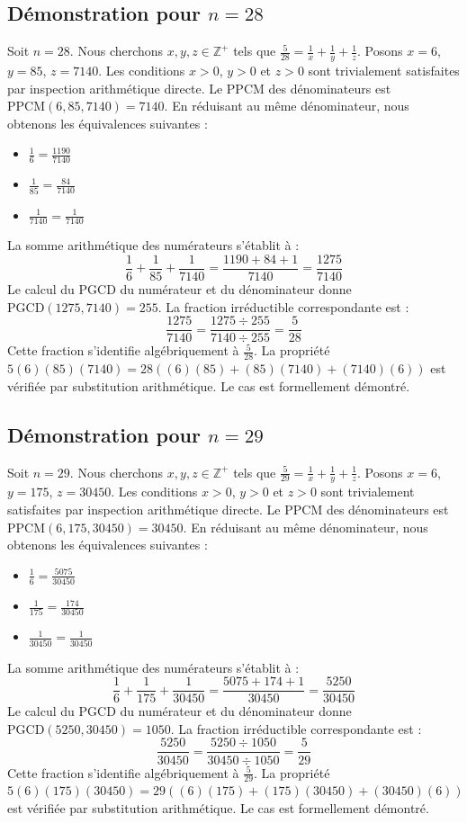 \documentclass[12pt,a4paper]{article}
\begin{document}
\subsection{Démonstration pour $n = 28$}
Soit $n = 28$. Nous cherchons $x, y, z \in \mathbb{Z}^{+}$ tels que $\frac{5}{28} = \frac{1}{x} + \frac{1}{y} + \frac{1}{z}$.
Posons $x = 6$, $y = 85$, $z = 7140$.
Les conditions $x > 0$, $y > 0$ et $z > 0$ sont trivialement satisfaites par inspection arithmétique directe.
Le PPCM des dénominateurs est $\text{PPCM}(6, 85, 7140) = 7140$.
En réduisant au même dénominateur, nous obtenons les équivalences suivantes :
\begin{itemize}
    \item $\frac{1}{6} = \frac{1190}{7140}$
    \item $\frac{1}{85} = \frac{84}{7140}$
    \item $\frac{1}{7140} = \frac{1}{7140}$
\end{itemize}
La somme arithmétique des numérateurs s'établit à :
$$ \frac{1}{6} + \frac{1}{85} + \frac{1}{7140} = \frac{1190 + 84 + 1}{7140} = \frac{1275}{7140} $$
Le calcul du PGCD du numérateur et du dénominateur donne $\text{PGCD}(1275, 7140) = 255$.
La fraction irréductible correspondante est :
$$ \frac{1275}{7140} = \frac{1275 \div 255}{7140 \div 255} = \frac{5}{28} $$
Cette fraction s'identifie algébriquement à $\frac{5}{28}$.
La propriété $5(6)(85)(7140) = 28((6)(85) + (85)(7140) + (7140)(6))$ est vérifiée par substitution arithmétique.
Le cas est formellement démontré.

\subsection{Démonstration pour $n = 29$}
Soit $n = 29$. Nous cherchons $x, y, z \in \mathbb{Z}^{+}$ tels que $\frac{5}{29} = \frac{1}{x} + \frac{1}{y} + \frac{1}{z}$.
Posons $x = 6$, $y = 175$, $z = 30450$.
Les conditions $x > 0$, $y > 0$ et $z > 0$ sont trivialement satisfaites par inspection arithmétique directe.
Le PPCM des dénominateurs est $\text{PPCM}(6, 175, 30450) = 30450$.
En réduisant au même dénominateur, nous obtenons les équivalences suivantes :
\begin{itemize}
    \item $\frac{1}{6} = \frac{5075}{30450}$
    \item $\frac{1}{175} = \frac{174}{30450}$
    \item $\frac{1}{30450} = \frac{1}{30450}$
\end{itemize}
La somme arithmétique des numérateurs s'établit à :
$$ \frac{1}{6} + \frac{1}{175} + \frac{1}{30450} = \frac{5075 + 174 + 1}{30450} = \frac{5250}{30450} $$
Le calcul du PGCD du numérateur et du dénominateur donne $\text{PGCD}(5250, 30450) = 1050$.
La fraction irréductible correspondante est :
$$ \frac{5250}{30450} = \frac{5250 \div 1050}{30450 \div 1050} = \frac{5}{29} $$
Cette fraction s'identifie algébriquement à $\frac{5}{29}$.
La propriété $5(6)(175)(30450) = 29((6)(175) + (175)(30450) + (30450)(6))$ est vérifiée par substitution arithmétique.
Le cas est formellement démontré.
\end{document}
